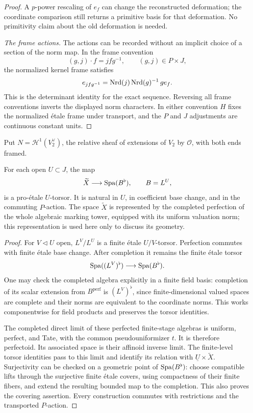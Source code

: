 \begin{proof}
A $p$-power rescaling of $e_f$ can change the reconstructed
deformation; the coordinate comparison still returns a primitive
basis for that deformation.  No primitivity claim about the old
deformation is needed.

\smallskip\noindent\emph{The frame actions.}
The actions can be recorded without an implicit choice of a section
of the norm map.  In the frame convention
\[
 (g,j)\cdot f=j f g^{-1},\qquad(g,j)\in P\times J,
\]
the normalized kernel frame satisfies
\begin{equation}
 e_{jfg^{-1}}=\operatorname{Nrd}(j)\operatorname{Nrd}(g)^{-1}\,g e_f.
 \label{eq:normalized-frame-action}
\end{equation}
This is the determinant identity for the exact sequence.  Reversing
all frame conventions inverts the displayed norm characters.
In either convention $H$ fixes the normalized étale frame under
transport, and the $P$ and $J$ adjustments are continuous constant
units.
\end{proof}

Put $N=\mathcal H^1(V_2^\vee)$, the relative sheaf of extensions of
$V_2$ by $\mathcal O$, with both ends framed.

\begin{lemma}
\label{lem:perfected-marking-torsor}
For each open $U\subset J$, the map
\[
 \widetilde X\longrightarrow\operatorname{Spa}(B^\flat),\qquad B=L^U,
\]
is a pro-étale $U$-torsor.  It is natural in $U$, in coefficient
base change, and in the commuting $P$-action.  The space
$\widetilde X$ is represented by the completed perfection of the
whole algebraic marking tower, equipped with its uniform valuation
norm; this representation is used here only to discuss its geometry.
\end{lemma}

\begin{proof}
For $V\triangleleft U$ open, $L^V/L^U$ is a finite étale
$U/V$-torsor.  Perfection commutes with finite étale base change.
After completion it remains the finite étale torsor
\[
 \operatorname{Spa}((L^V)^\flat)\longrightarrow\operatorname{Spa}(B^\flat).
\]
One may check the completed algebra explicitly in a finite field
basis: completion of its scalar extension from $B^{\mathrm{perf}}$
is $(L^V)^\flat$, since finite-dimensional valued spaces are
complete and their norms are equivalent to the coordinate norms.
This works componentwise for field products and preserves the
torsor identities.

The completed direct limit of these perfected finite-stage
algebras is uniform, perfect, and Tate, with the common
pseudouniformizer $t$.  It is therefore perfectoid.  Its associated
space is their affinoid inverse limit.  The finite-level torsor
identities pass to this limit and identify its relation with
$\underline U\times\widetilde X$.
Surjectivity can be checked on a geometric point of $\operatorname{Spa}(B^\flat)$:
choose compatible lifts through the surjective finite étale
covers, using compactness of their finite fibers, and extend the
resulting bounded map to the completion.  This also proves the
covering assertion.  Every construction commutes with restrictions
and the transported $P$-action.
\end{proof}

